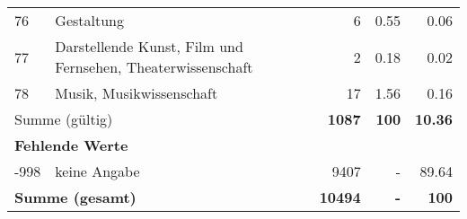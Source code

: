 \begin{longtable}{lXrrr}
        76 & \multicolumn{1}{X}{Gestaltung} & %
          \num{6} &
          \num[round-mode=places,round-precision=2]{0.55} &
          \num[round-mode=places,round-precision=2]{0.06} \\

        77 & \multicolumn{1}{X}{Darstellende Kunst, Film und Fernsehen, Theaterwissenschaft} & %
          \num{2} &
          \num[round-mode=places,round-precision=2]{0.18} &
          \num[round-mode=places,round-precision=2]{0.02} \\

        78 & \multicolumn{1}{X}{Musik, Musikwissenschaft} & %
          \num{17} &
          \num[round-mode=places,round-precision=2]{1.56} &
          \num[round-mode=places,round-precision=2]{0.16} \\

     \midrule
     \multicolumn{2}{l}{Summe (gültig)} &
       \textbf{\num{1087}} &
     \textbf{\num{100}} &
       \textbf{\num[round-mode=places,round-precision=2]{10.36}} \\
     \multicolumn{5}{l}{\textbf{Fehlende Werte}}\\
       -998 &
       keine Angabe &
         \num{9407} &
        - &
         \num[round-mode=places,round-precision=2]{89.64} \\
     \midrule
     \multicolumn{2}{l}{\textbf{Summe (gesamt)}} &
          \textbf{\num{10494}} &
        \textbf{-} &
        \textbf{\num{100}} \\
     \bottomrule
     \end{longtable}
     
